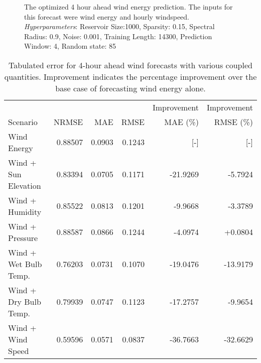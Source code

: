 \begin{figure*}[h]
  \centering
  
  \caption{The optimized 4 hour ahead wind energy prediction. The inputs for this forecast were wind energy and hourly windspeed. \textit{Hyperparameters}: Reservoir Size:1000, Sparsity: 0.15, Spectral Radius: 0.9, Noise: 0.001, Training Length: 14300, Prediction Window: 4, Random state: 85}
  \label{fig:wind04}
\end{figure*}
  \begin{table*}[h]
    \centering
    \caption{Tabulated error for 4-hour ahead wind forecasts with various coupled quantities. Improvement indicates the percentage improvement over the base case of forecasting wind energy alone.}
    \label{tab:wind04}
    \begin{tabular}{l|r|r|r|r|r}
      & & & & Improvement & Improvement \\
      Scenario &NRMSE & MAE & RMSE & MAE (\%) & RMSE (\%)\\
      \hline
      Wind Energy & 0.88507 &0.0903 & 0.1243 & [-] & [-] \\
      Wind + Sun Elevation & 0.83394 &0.0705 & 0.1171 & -21.9269 & -5.7924 \\
      Wind + Humidity & 0.85522 & 0.0813 & 0.1201 & -9.9668 & -3.3789 \\
      Wind + Pressure & 0.88587 & 0.0866 & 0.1244 & -4.0974 & +0.0804 \\
      Wind + Wet Bulb Temp. & 0.76203 & 0.0731 & 0.1070 & -19.0476 & -13.9179 \\
      Wind + Dry Bulb Temp. & 0.79939 & 0.0747 & 0.1123 & -17.2757 & -9.9654 \\
      Wind + Wind Speed & 0.59596 & 0.0571 & 0.0837 & -36.7663 & -32.6629 \\
    \end{tabular}
  \end{table*}
